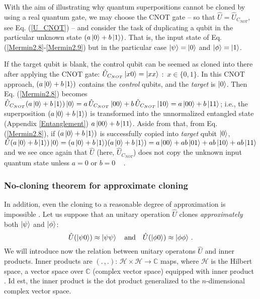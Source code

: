 \documentclass[11pt]{article}
\numberwithin{equation}{section} %
\numberwithin{figure}{section} %
\begin{document}
\begin{appendices}
With the aim of illustrating why quantum superpositions cannot be cloned by using a real quantum gate, we may choose the CNOT gate -- so that $\hat{U}=\hat{U}_{C_{NOT}}$, see Eq. (\ref{U_CNOT}) -- and consider the task of duplicating a qubit in the particular unknown state $(a\ket{0}+b\ket{1})$. That is, the input state of Eq. (\ref{Mermin2.8}-\ref{Mermin2.9}) but in the particular case $\ket{\psi}=\ket{0}$ and $\ket{\phi}=\ket{1}$.  

If the target qubit is blank, the control qubit can be seemed as cloned into there after applying the CNOT gate: $\hat{U}_{C_{NOT}}\ket{x0}=\ket{xx}$ $:$ $x\in\{0,1\}$. In this CNOT approach, $(a\ket{0}+b\ket{1})$ contains the \emph{control} qubits, and the \emph{target} is $\ket{0}$. Then Eq. (\ref{Mermin2.8}) becomes $\hat{U}_{C_{NOT}}(a\ket{0}+b\ket{1})\ket{0}=a\,\hat{U}_{C_{NOT}}\ket{00}+b\,\hat{U}_{C_{NOT}}\ket{10}=a\ket{00}+b\ket{11}$; i.e., the superposition $(a\ket{0}+b\ket{1})$ is transformed into the unnormalized entangled state (Appendix \ref{Entanglement}) $a\ket{00}+b\ket{11}$. Aside from that, from Eq. (\ref{Mermin2.8}), if $(a\ket{0}+b\ket{1})$ is successfully copied into \emph{target} qubit $\ket{0}$, $\hat{U}(a\ket{0}+b\ket{1})\ket{0}=(a\ket{0}+b\ket{1})(a\ket{0}+b\ket{1})=a\ket{00}+ab\ket{01}+ab\ket{10}+ab\ket{11}$ and we see once again that $\hat{U}$ (here, $\hat{U}_{C_{NOT}}$) does not copy the unknown input quantum state unless  $a=0$ or $b=0$  $\,\,\,$ \cite[p.~24, l.~8-19]{Nielsen}.\\ 

\subsubsection{No-cloning theorem for approximate cloning}

In addition, even the cloning to a reasonable degree of approximation is impossible \cite[p.~40, l.~6-7]{Mermin}. Let us suppose that an unitary operation $\hat{U}$ clones \emph{approximately} both $\ket{\psi}$ and $\ket{\phi}$:
\begin{equation} \label{Mermin2.11}
\hat{U}(\ket{\psi 0})\approx\ket{\psi\psi}\quad\textrm{and}\quad\hat{U}(\ket{\phi 0})\approx\ket{\phi\phi}\,\textrm{.}
\end{equation}
We will introduce now the relation between unitary operatons $\hat{U}$ and inner products. Inner products are $(.\,,.):\,\mathcal{H}\times\mathcal{H}\rightarrow\mathbb{C}$ maps, where $\mathcal{H}$ is the Hilbert space, a vector space over $\mathbb{C}$ (complex vector space) equipped with inner product \cite[p.~80, l.~15-16]{Nielsen}. Id est, the inner product is the dot product generalized to the $n$-dimensional complex vector space.


\end{appendices}
\end{document}
